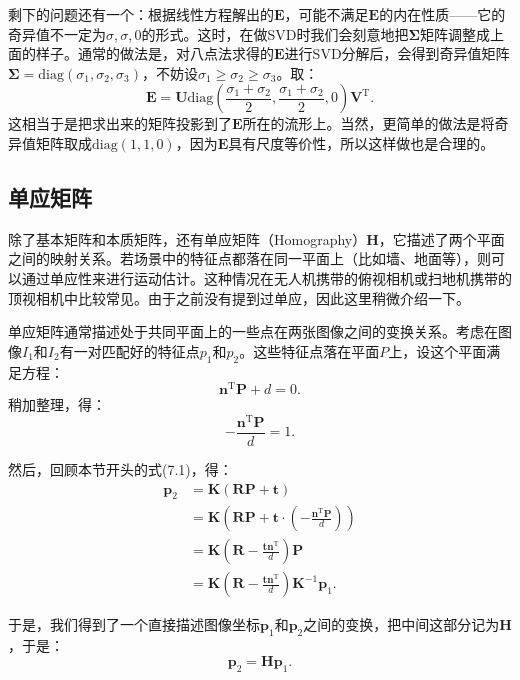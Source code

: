 剩下的问题还有一个：根据线性方程解出的$\bm{E}$，可能不满足$\bm{E}$的内在性质——它的奇异值不一定为${\sigma}, {\sigma}, 0$的形式。这时，在做SVD时我们会刻意地把$\bm{\Sigma}$矩阵调整成上面的样子。通常的做法是，对八点法求得的$\bm{E}$进行SVD分解后，会得到奇异值矩阵$\bm{\Sigma} =  \mathrm{diag} ( \sigma_1, \sigma_2, \sigma_3)$，不妨设$\sigma_1 \geqslant \sigma_2 \geqslant \sigma_3$。取：
\begin{equation}
\bm{E} = \bm{U} \mathrm{diag} (\frac{\sigma_1+\sigma_2}{2}, \frac{\sigma_1+\sigma_2}{2}, 0) \bm{V}^\mathrm{T}.
\end{equation}
这相当于是把求出来的矩阵投影到了$\bm{E}$所在的流形上。当然，更简单的做法是将奇异值矩阵取成$\mathrm{diag} (1,1,0)$，因为$\bm{E}$具有尺度等价性，所以这样做也是合理的。

\subsection{单应矩阵}
除了基本矩阵和本质矩阵，还有单应矩阵（Homography）$\bm{H}$，它描述了两个平面之间的映射关系。若场景中的特征点都落在同一平面上（比如墙、地面等），则可以通过单应性来进行运动估计。这种情况在无人机携带的俯视相机或扫地机携带的顶视相机中比较常见。由于之前没有提到过单应，因此这里稍微介绍一下。

单应矩阵通常描述处于共同平面上的一些点在两张图像之间的变换关系。考虑在图像$I_{1}$和$I_{2}$有一对匹配好的特征点$p_{1}$和$p_{2}$。这些特征点落在平面$P$上，设这个平面满足方程：
\begin{equation}
\bm{n}^\mathrm{T} \bm{P} + d = 0.
\end{equation}
稍加整理，得：
\begin{equation}
- \frac{\bm{n}^\mathrm{T} \bm{P} }{d} = 1.
\end{equation}

然后，回顾本节开头的式(7.1)，得：
\begin{align*}
\bm{p}_2 &= \bm{K} ( \bm{R} \bm{P} + \bm{t} ) \\ 
&= \bm{K} \left( \bm{R} \bm{P} + \bm{t} \cdot (- \frac{\bm{n}^\mathrm{T} \bm{P} }{d}) \right) \\
&= \bm{K} \left( \bm{R} - \frac{\bm{t} \bm{n}^\mathrm{T} }{d} \right) \bm{P} \\ 
&= \bm{K} \left( \bm{R} - \frac{\bm{t} \bm{n}^\mathrm{T} }{d} \right) \bm{K}^{-1} \bm{p}_1.
\end{align*}

于是，我们得到了一个直接描述图像坐标$\bm{p}_1$和$\bm{p}_2$之间的变换，把中间这部分记为$\bm{H}$，于是：
\begin{equation}
\bm{p}_2 = \bm{H} \bm{p}_1.
\end{equation}

